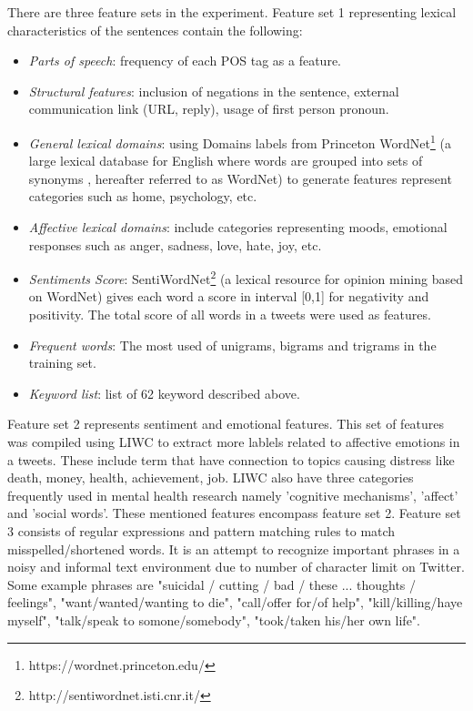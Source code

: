 There are three feature sets in the experiment. Feature set 1 representing lexical characteristics of the sentences contain the following:
\begin{itemize}
\item \textit{Parts of speech}: frequency of each POS tag as a feature.
\item\textit{ Structural features}: inclusion of negations in the sentence, external communication link (URL, reply), usage of first person pronoun.
\item \textit{General lexical domains}: using Domains labels from Princeton WordNet\textsuperscript{\textregistered}\footnote{https://wordnet.princeton.edu/} (a large lexical database for English where words are grouped into sets of synonyms \cite{Fellbaum1998}, hereafter referred to as WordNet) to generate features represent categories such as home, psychology, etc.
\item \textit{Affective lexical domains}: include categories representing moods, emotional responses such as anger, sadness, love, hate, joy, etc.
\item \textit{Sentiments Score}: SentiWordNet\footnote{http://sentiwordnet.isti.cnr.it/} (a lexical resource for opinion mining based on WordNet) gives each word a score in interval [0,1] for negativity and positivity. The total score of all words in a tweets were used as features.
\item \textit{Frequent words}: The most used of unigrams, bigrams and trigrams in the training set.
\item \textit{Keyword list}: list of 62 keyword described above. 
\end{itemize}
Feature set 2 represents sentiment and emotional features. This set of features was compiled using LIWC to extract more lablels related to affective emotions in a tweets. These include term that have connection to topics causing distress like death, money, health, achievement, job. LIWC also have three categories frequently used in mental health research namely 'cognitive mechanisms', 'affect' and 'social words'. These mentioned features encompass feature set 2. Feature set 3 consists of regular expressions and pattern matching rules to match misspelled/shortened words. It is an attempt to recognize important phrases in a noisy and informal text environment due to number of character limit on Twitter. Some example phrases are "suicidal / cutting / bad / these ... thoughts / feelings", "want/wanted/wanting to die", "call/offer for/of help", "kill/killing/haye myself", "talk/speak to somone/somebody", "took/taken his/her own life". 
